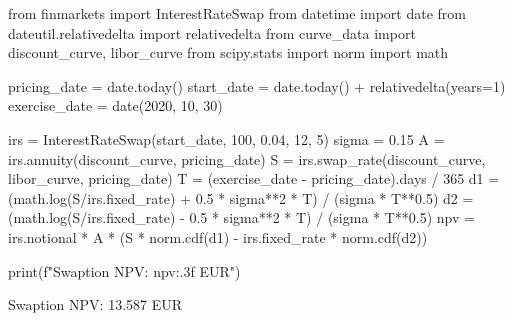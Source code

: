 \cprotEnv\begin{solution}
\begin{ipython}
from finmarkets import InterestRateSwap
from datetime import date
from dateutil.relativedelta import relativedelta
from curve_data import discount_curve, libor_curve
from scipy.stats import norm
import math

pricing_date = date.today()
start_date = date.today() + relativedelta(years=1)
exercise_date = date(2020, 10, 30)

irs = InterestRateSwap(start_date, 100, 0.04, 12, 5)
sigma = 0.15
A = irs.annuity(discount_curve, pricing_date)
S = irs.swap_rate(discount_curve, libor_curve, pricing_date)
T = (exercise_date - pricing_date).days / 365
d1 = (math.log(S/irs.fixed_rate) + 0.5 * sigma**2 * T) / (sigma * T**0.5)
d2 = (math.log(S/irs.fixed_rate) - 0.5 * sigma**2 * T) / (sigma * T**0.5)
npv = irs.notional * A * (S * norm.cdf(d1) - irs.fixed_rate * norm.cdf(d2))

print(f"Swaption NPV: {npv:.3f} EUR")
\end{ipython}
\begin{ioutput}
Swaption NPV: 13.587 EUR
\end{ioutput}
\end{solution}
